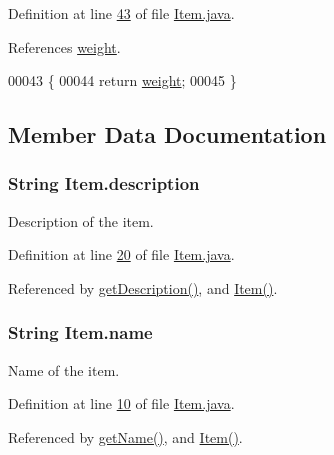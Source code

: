 Definition at line \hyperlink{Item_8java_source_l00043}{43} of file \hyperlink{Item_8java_source}{Item.\-java}.



References \hyperlink{Item_8java_source_l00015}{weight}.


\begin{DoxyCode}
00043                            \{
00044         \textcolor{keywordflow}{return} \hyperlink{classItem_ade554833393860faaece5e514637b5d0}{weight};
00045     \}
\end{DoxyCode}


\subsection{Member Data Documentation}
\hypertarget{classItem_a663fa7220137071baee5c660b01a82df}{
\subsubsection[{description}]{\setlength{\rightskip}{0pt plus 5cm}String Item.\-description\hspace{0.3cm}{\ttfamily [private]}}}\label{classItem_a663fa7220137071baee5c660b01a82df}
Description of the item. 

Definition at line \hyperlink{Item_8java_source_l00020}{20} of file \hyperlink{Item_8java_source}{Item.\-java}.



Referenced by \hyperlink{Item_8java_source_l00050}{get\-Description()}, and \hyperlink{Item_8java_source_l00027}{Item()}.

\hypertarget{classItem_a42fd6d4796fcf652806278f65ce93a3b}{
\subsubsection[{name}]{\setlength{\rightskip}{0pt plus 5cm}String Item.\-name\hspace{0.3cm}{\ttfamily [private]}}}\label{classItem_a42fd6d4796fcf652806278f65ce93a3b}
Name of the item. 

Definition at line \hyperlink{Item_8java_source_l00010}{10} of file \hyperlink{Item_8java_source}{Item.\-java}.



Referenced by \hyperlink{Item_8java_source_l00036}{get\-Name()}, and \hyperlink{Item_8java_source_l00027}{Item()}.

